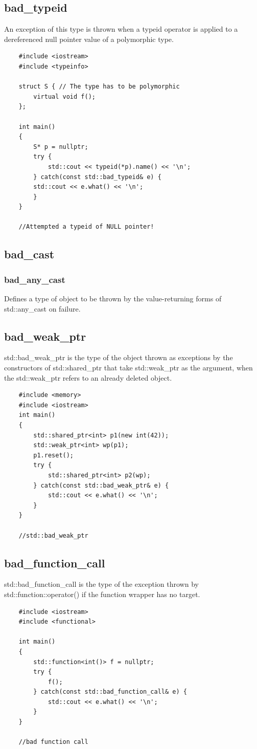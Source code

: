 \documentclass[UTF8,a4paper,12pt]{ctexbook}
\begin{document}
		\subsection{bad\_typeid}
			An exception of this type is thrown when a typeid operator is applied to a dereferenced null pointer value of a polymorphic type.
			
\begin{lstlisting}
	#include <iostream>
	#include <typeinfo>
	
	struct S { // The type has to be polymorphic
		virtual void f();
	}; 
	
	int main()
	{
		S* p = nullptr;
		try {
			std::cout << typeid(*p).name() << '\n';
		} catch(const std::bad_typeid& e) {
		std::cout << e.what() << '\n';
		}
	}
	
	//Attempted a typeid of NULL pointer!
\end{lstlisting}
		\subsection{bad\_cast}
			\subsubsection{bad\_any\_cast}
				Defines a type of object to be thrown by the value-returning forms of std::any\_cast on failure. 
		\subsection{bad\_weak\_ptr}
			std::bad\_weak\_ptr is the type of the object thrown as exceptions by the constructors of std::shared\_ptr that take std::weak\_ptr as the argument, when the std::weak\_ptr refers to an already deleted object. 
\begin{lstlisting}
	#include <memory>
	#include <iostream>
	int main()
	{
		std::shared_ptr<int> p1(new int(42));
		std::weak_ptr<int> wp(p1);
		p1.reset();
		try {
			std::shared_ptr<int> p2(wp);
		} catch(const std::bad_weak_ptr& e) {
			std::cout << e.what() << '\n';
		}
	}
	
	//std::bad_weak_ptr
\end{lstlisting}
		\subsection{bad\_function\_call}
			std::bad\_function\_call is the type of the exception thrown by std::function::operator() if the function wrapper has no target. 
\begin{lstlisting}
	#include <iostream>
	#include <functional>
	
	int main()
	{
		std::function<int()> f = nullptr;
		try {
			f();
		} catch(const std::bad_function_call& e) {
			std::cout << e.what() << '\n';
		}
	}
	
	//bad function call
\end{lstlisting}
\end{document}
